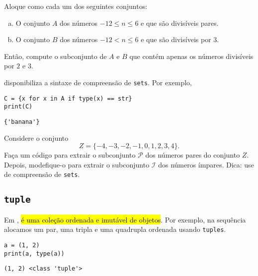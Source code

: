 \documentclass[a4paper,10pt,twoside]{article}
\begin{document}
\begin{exr}
  Aloque como {\PYTHONset} cada um dos seguintes conjuntos:
  \begin{enumerate}[a)]
    \item O conjunto $A$ dos números $-12 \leq n \leq 6$ e que são divisíveis pares.
    \item O conjunto $B$ dos números $-12 < n \leq 6$ e que são divisíveis por 3.
  \end{enumerate}
  Então, compute o subconjunto de $A$ e $B$ que contém apenas os números divisíveis por $2$ e $3$.
\end{exr}

\begin{obs}\label{obs:compreensão_de_conjuntos}
  {\python} disponibiliza a sintaxe de compreensão de \texttt{sets}. Por exemplo,

\begin{lstlisting}
C = {x for x in A if type(x) == str}
print(C)
\end{lstlisting}

\begin{verbatim}
{'banana'}
\end{verbatim}

\end{obs}

\begin{exr}
  Considere o conjunto
  \begin{equation}
    Z = \{-4, -3, -2, -1, 0, 1, 2, 3, 4\}.
  \end{equation}
  Faça um código {\python} para extrair o subconjunto $\mathcal{P}$ dos números pares do conjunto $Z$. Depois, modefique-o para extrair o subconjunto $\mathcal{I}$ dos números ímpares. Dica: use de compreensão de \texttt{sets}.
\end{exr}

\subsection{\texttt{tuple}}

Em {\python}, \hl{{\PYTHONtuple} é uma coleção ordenada e imutável de objetos}. Por exemplo, na sequência alocamos um par, uma tripla e uma quadrupla ordenada usando \texttt{tuples}.

\begin{lstlisting}
a = (1, 2)
print(a, type(a))
\end{lstlisting}

\begin{verbatim}
(1, 2) <class 'tuple'>
\end{verbatim}
\end{document}
